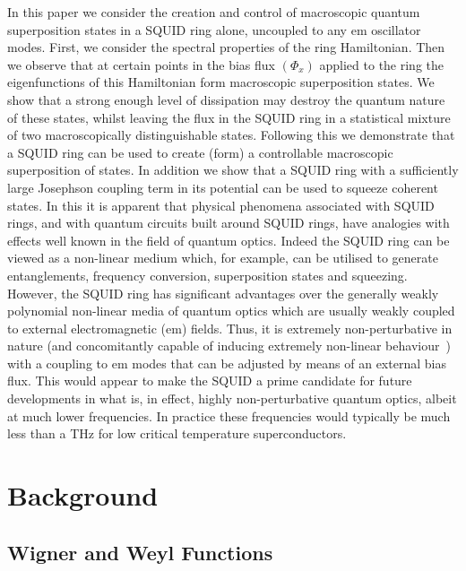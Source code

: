 \documentclass[12pt,a4paper,superscriptaddress,showpacs,floatfix,pra]{revtex4-2}
\begin{document}
In  this paper  we consider  the creation  and control  of macroscopic
quantum superposition states  in a SQUID ring alone,  uncoupled to any
em oscillator modes. First, we consider the spectral properties of the
ring Hamiltonian.  Then we observe  that at certain points in the bias
flux $\left( \Phi _{x}\right) $ applied to the ring the eigenfunctions
of  this Hamiltonian  form macroscopic  superposition states.  We show
that  a strong  enough level  of dissipation  may destroy  the quantum
nature of these states, whilst leaving the flux in the SQUID ring in a
statistical    mixture   of   two    macroscopically   distinguishable
states. Following this we demonstrate that a SQUID ring can be used to
create (form) a controllable  macroscopic superposition of states.  In
addition we show that a SQUID ring with a sufficiently large Josephson
coupling  term  in its  potential  can  be  used to  squeeze  coherent
states. In this it is apparent that physical phenomena associated with
SQUID rings, and with quantum  circuits built around SQUID rings, have
analogies   with  effects  well   known  in   the  field   of  quantum
optics. Indeed  the SQUID  ring can be  viewed as a  non-linear medium
which,  for  example,  can  be  utilised  to  generate  entanglements,
frequency conversion, superposition states and squeezing. However, the
SQUID  ring  has  significant  advantages over  the  generally  weakly
polynomial non-linear media of quantum optics which are usually weakly
coupled to external electromagnetic (em) fields. Thus, it is extremely
non-perturbative  in  nature (and  concomitantly  capable of  inducing
extremely                                                    non-linear
behaviour~\cite{EverittSCVRPP01,EverittCSPPVR01,Spi1992})    with    a
coupling to em modes that can be adjusted by means of an external bias
flux. This would appear to make the SQUID a prime candidate for future
developments in  what is,  in effect, highly  non-perturbative quantum
optics,  albeit   at  much   lower  frequencies.  In   practice  these
frequencies would typically  be much less than a  THz for low critical
temperature superconductors.

\section{Background}

\subsection{Wigner and Weyl Functions}
\end{document}
